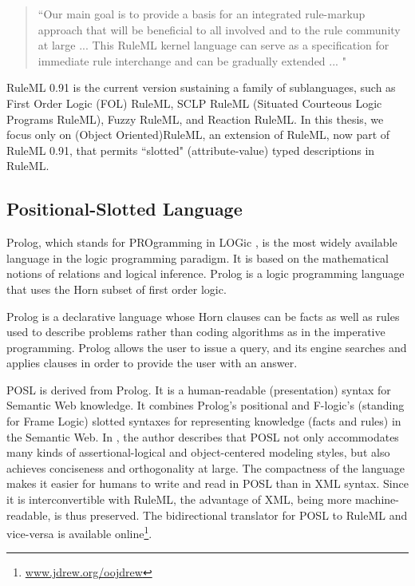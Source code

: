 \begin{quote}
    ``Our main goal is to provide a basis for an integrated rule-markup
    approach that will be beneficial to all involved and to the rule
    community at large ... This RuleML kernel language can serve as a
    specification for immediate rule interchange and can be gradually
    extended ... "
\end{quote}

\hspace{0.3in}RuleML 0.91 is the current version sustaining a family of sublanguages, such as First Order Logic (FOL)
RuleML, SCLP RuleML (Situated Courteous Logic Programs RuleML), Fuzzy RuleML, and Reaction RuleML. In this thesis, we focus only on (Object Oriented)RuleML, an extension of RuleML, now part of RuleML 0.91, that permits ``slotted" (attribute-value) typed descriptions in RuleML.

\subsection{Positional-Slotted Language}

\hspace{0.3in}Prolog, which stands for PROgramming in LOGic \cite{CM:04}, is the most widely available language in the logic programming paradigm. It is based on the  mathematical notions of relations and logical inference. Prolog is a logic programming language that uses the Horn subset of first order logic.

\hspace{0.3in}Prolog is a declarative language whose Horn clauses can be facts as well as rules used to describe problems rather than coding algorithms as in the imperative programming. Prolog allows the user to issue a query, and its engine searches and applies clauses in order to provide the user with an answer.

\hspace{0.3in}POSL is derived from Prolog. It is a human-readable (presentation) syntax for Semantic Web knowledge. It combines Prolog's positional and F-logic's (standing for Frame Logic) \cite{MK:95} slotted syntaxes for representing knowledge (facts and rules) in the Semantic Web. In \cite{HB:05}, the author describes that POSL not only accommodates many kinds of assertional-logical and object-centered modeling styles, but also achieves conciseness and orthogonality at large. The compactness of the language makes it easier for humans to write and read in POSL than in XML syntax.
Since it is interconvertible with RuleML, the advantage of XML, being more machine-readable, is thus preserved. The bidirectional translator for POSL to RuleML and vice-versa is available online\footnote{\href{http://www.jdrew.org/oojdrew}{\url{www.jdrew.org/oojdrew}}}.

